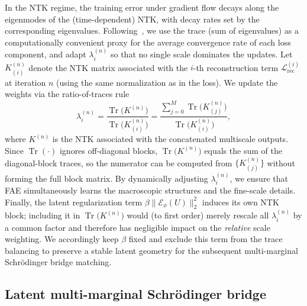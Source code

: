 \documentclass[review,onefignum,onetabnum]{siamart250211}
\newcommand{\Tr}{\operatorname{Tr}}
\newcommand{\1}{\mathbf{1}}
\newcommand{\cE}{\mathcal{E}}
\begin{document}
In the NTK regime, the training error under gradient flow decays along the eigenmodes of the (time-dependent) NTK, with decay rates set by the corresponding eigenvalues. Following~\cite{wang2022pinnsntk}, we use the trace (sum of eigenvalues) as a computationally convenient proxy for the average convergence rate of each loss component, and adapt $\lambda_i^{(n)}$ so that no single scale dominates the updates. Let $K_{(i)}^{(n)}$ denote the NTK matrix associated with the $i$-th reconstruction term $\mathcal{L}_{\mathrm{rec}}^{(i)}$ at iteration $n$ (using the same normalization as in the loss). We update the weights via the ratio-of-traces rule
\begin{equation}
\lambda_i^{(n)} = \frac{\Tr\big(K^{(n)}\big)}{\Tr\big(K_{(i)}^{(n)}\big)}=\frac{\sum_{j=0}^M \Tr\big(K_{(j)}^{(n)}\big)}{\Tr\big(K_{(i)}^{(n)}\big)},
\label{eq:ntk_weights}
\end{equation}
where $K^{(n)}$ is the NTK associated with the concatenated multiscale outputs. Since $\Tr(\cdot)$ ignores off-diagonal blocks, $\Tr\!\big(K^{(n)}\big)$ equals the sum of the diagonal-block traces, so the numerator can be computed from $\{K_{(j)}^{(n)}\}$ without forming the full block matrix.
By dynamically adjusting $\lambda_i^{(n)}$, we ensure that \textsc{FAE} simultaneously learns the macroscopic structures and the fine-scale details. Finally, the latent regularization term $\beta \|\cE_\phi(U)\|_2^2$ induces its own NTK block; including it in $\Tr\!\big(K^{(n)}\big)$ would (to first order) merely rescale all $\lambda_i^{(n)}$ by a common factor and therefore has negligible impact on the \emph{relative} scale weighting. We accordingly keep $\beta$ fixed and exclude this term from the trace balancing to preserve a stable latent geometry for the subsequent multi-marginal Schr\"odinger bridge matching.


\subsection{Latent multi-marginal Schr\"odinger bridge}\label{sec:msbm}
\end{document}
